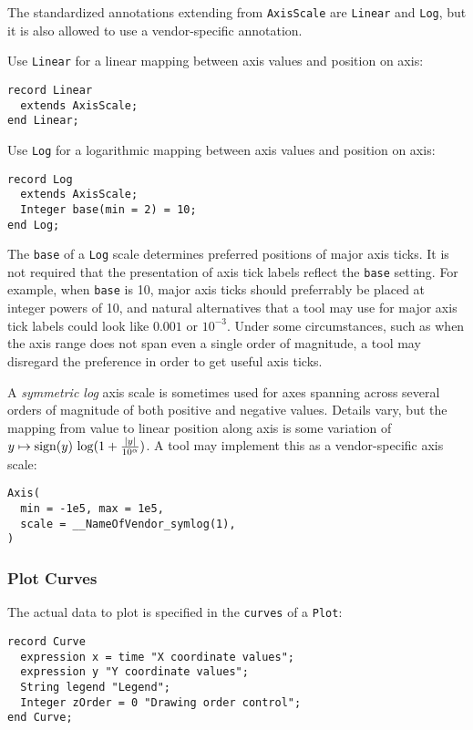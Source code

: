 The standardized annotations extending from \lstinline!AxisScale! are \lstinline!Linear! and  \lstinline!Log!, but it is also allowed to use a vendor-specific annotation.

Use \lstinline!Linear! for a linear mapping between axis values and position on axis:
\begin{lstlisting}[language=modelica]
record Linear
  extends AxisScale;
end Linear;
\end{lstlisting}%

Use \lstinline!Log! for a logarithmic mapping between axis values and position on axis:
\begin{lstlisting}[language=modelica]
record Log
  extends AxisScale;
  Integer base(min = 2) = 10;
end Log;
\end{lstlisting}%

The \lstinline!base! of a \lstinline!Log! scale determines preferred positions of major axis ticks.
It is not required that the presentation of axis tick labels reflect the \lstinline!base! setting.
For example, when \lstinline!base! is 10, major axis ticks should preferrably be placed at integer powers of 10, and natural alternatives that a tool may use for major axis tick labels could look like $0.001$ or $10^{-3}$.
Under some circumstances, such as when the axis range does not span even a single order of magnitude, a tool may disregard the preference in order to get useful axis ticks.

\begin{example}
A \emph{symmetric log} axis scale is sometimes used for axes spanning across several orders of magnitude of both positive and negative values.
Details vary, but the mapping from value to linear position along axis is some variation of $y \mapsto \operatorname{sign}(y)\, \operatorname{log}(1 + \frac{\left\lvert y{} \right\rvert}{10^{\alpha}})$.
A tool may implement this as a vendor-specific axis scale:
\begin{lstlisting}[language=modelica]
Axis(
  min = -1e5, max = 1e5,
  scale = __NameOfVendor_symlog(1),
)
\end{lstlisting}
\end{example}

\subsubsection{Plot Curves}\label{plot-curves}

The actual data to plot is specified in the \lstinline!curves! of a \lstinline!Plot!:
\begin{lstlisting}[language=modelica]
record Curve
  expression x = time "X coordinate values";
  expression y "Y coordinate values";
  String legend "Legend";
  Integer zOrder = 0 "Drawing order control";
end Curve;
\end{lstlisting}

